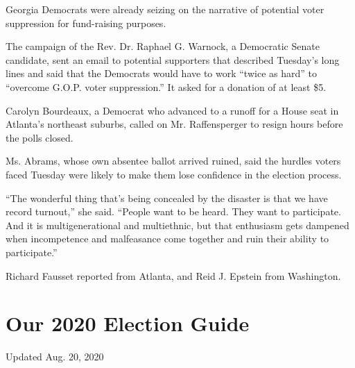 Georgia Democrats were already seizing on the narrative of potential
voter suppression for fund-raising purposes.

The campaign of the Rev. Dr. Raphael G. Warnock, a Democratic Senate
candidate, sent an email to potential supporters that described
Tuesday's long lines and said that the Democrats would have to work
``twice as hard'' to ``overcome G.O.P. voter suppression.'' It asked for
a donation of at least \$5.

Carolyn Bourdeaux, a Democrat who advanced to a runoff for a House seat
in Atlanta's northeast suburbs, called on Mr. Raffensperger to resign
hours before the polls closed.

Ms. Abrams, whose own absentee ballot arrived ruined, said the hurdles
voters faced Tuesday were likely to make them lose confidence in the
election process.

``The wonderful thing that's being concealed by the disaster is that we
have record turnout,'' she said. ``People want to be heard. They want to
participate. And it is multigenerational and multiethnic, but that
enthusiasm gets dampened when incompetence and malfeasance come together
and ruin their ability to participate.''

Richard Fausset reported from Atlanta, and Reid J. Epstein from
Washington.

\hypertarget{our-2020-election-guide}{%
\section{Our 2020 Election Guide}\label{our-2020-election-guide}}

Updated Aug. 20, 2020


